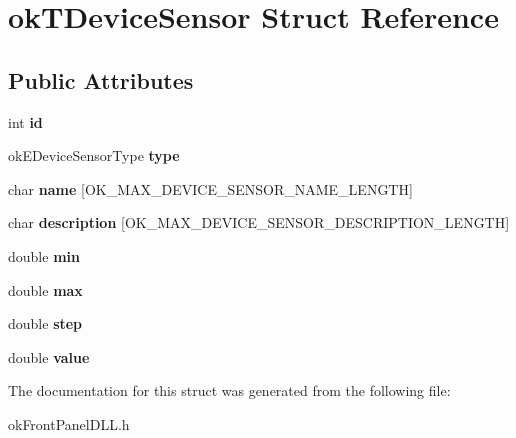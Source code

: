 \hypertarget{structokTDeviceSensor}{\section{ok\+T\+Device\+Sensor Struct Reference}
\label{structokTDeviceSensor}
}
\subsection*{Public Attributes}
\begin{DoxyCompactItemize}
\item 
\hypertarget{structokTDeviceSensor_af5e617d93771f47dfcb294469e9dd2c6}{int {\bfseries id}}\label{structokTDeviceSensor_af5e617d93771f47dfcb294469e9dd2c6}

\item 
\hypertarget{structokTDeviceSensor_aa5ddd4a964a939282abf2bf54a3e41c2}{ok\+E\+Device\+Sensor\+Type {\bfseries type}}\label{structokTDeviceSensor_aa5ddd4a964a939282abf2bf54a3e41c2}

\item 
\hypertarget{structokTDeviceSensor_aa2bcf2604aa79ff8107e35270eed0ba8}{char {\bfseries name} \mbox{[}O\+K\+\_\+\+M\+A\+X\+\_\+\+D\+E\+V\+I\+C\+E\+\_\+\+S\+E\+N\+S\+O\+R\+\_\+\+N\+A\+M\+E\+\_\+\+L\+E\+N\+G\+T\+H\mbox{]}}\label{structokTDeviceSensor_aa2bcf2604aa79ff8107e35270eed0ba8}

\item 
\hypertarget{structokTDeviceSensor_a4fb2875f8d44836a12f0545da987c7e5}{char {\bfseries description} \mbox{[}O\+K\+\_\+\+M\+A\+X\+\_\+\+D\+E\+V\+I\+C\+E\+\_\+\+S\+E\+N\+S\+O\+R\+\_\+\+D\+E\+S\+C\+R\+I\+P\+T\+I\+O\+N\+\_\+\+L\+E\+N\+G\+T\+H\mbox{]}}\label{structokTDeviceSensor_a4fb2875f8d44836a12f0545da987c7e5}

\item 
\hypertarget{structokTDeviceSensor_a414f04f4373ce6172eb9fcfff03521b1}{double {\bfseries min}}\label{structokTDeviceSensor_a414f04f4373ce6172eb9fcfff03521b1}

\item 
\hypertarget{structokTDeviceSensor_a84e0f1f01cf7fafbf6377686f83b1f52}{double {\bfseries max}}\label{structokTDeviceSensor_a84e0f1f01cf7fafbf6377686f83b1f52}

\item 
\hypertarget{structokTDeviceSensor_a46690185b8236e08a0b1d3142d345527}{double {\bfseries step}}\label{structokTDeviceSensor_a46690185b8236e08a0b1d3142d345527}

\item 
\hypertarget{structokTDeviceSensor_abf4c5137ac42c8705f1fce3ffc885cc2}{double {\bfseries value}}\label{structokTDeviceSensor_abf4c5137ac42c8705f1fce3ffc885cc2}

\end{DoxyCompactItemize}


The documentation for this struct was generated from the following file\+:\begin{DoxyCompactItemize}
\item 
ok\+Front\+Panel\+D\+L\+L.\+h\end{DoxyCompactItemize}
